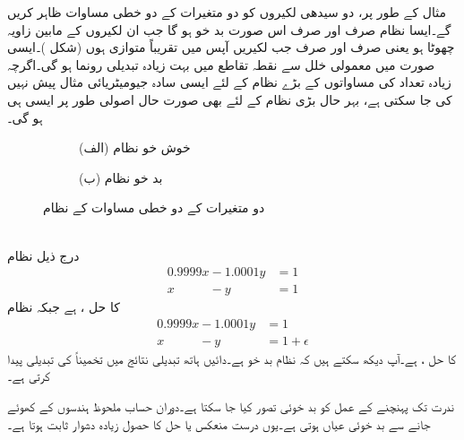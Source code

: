 مثال کے طور پر، دو سیدھی لکیروں کو دو متغیرات کے دو خطی مساوات ظاہر کریں گے۔ایسا نظام صرف اور صرف اس صورت بد خو ہو گا جب ان لکیروں کے مابین زاویہ  چھوٹا ہو یعنی صرف اور صرف جب لکیریں آپس میں تقریباً متوازی ہوں (شکل )۔ایسی صورت میں معمولی خلل سے نقطہ تقاطع میں بہت زیادہ تبدیلی رونما ہو گی۔اگرچہ زیادہ تعداد کی مساواتوں کے بڑے نظام کے لئے ایسی سادہ جیومیٹریائی مثال پیش نہیں کی جا سکتی ہے، بہر حال بڑی نظام کے لئے بھی  صورت حال اصولی طور پر ایسی ہی ہو گی۔ 
\begin{figure}
\centering
\begin{subfigure}{0.5\textwidth}
\centering
{}
\caption*{(الف) خوش خو نظام}
\end{subfigure}%
\begin{subfigure}{0.5\textwidth}
\centering
{}
\caption*{(ب) بد خو نظام}
\end{subfigure}%
\caption{دو متغیرات کے دو خطی مساوات کے نظام}
\label{شکل_خطی_اعدادی_بد_خو_خوش_خو}
\end{figure}

\quad {}\\
درج ذیل نظام
\begin{align*}
0.9999x-1.0001y&=1\\
x\phantom{1.0000}-y&=1
\end{align*}
کا حل ،  ہے جبکہ نظام
\begin{align*}
0.9999x-1.0001y&=1\\
x\phantom{1.0000}-y&=1+\epsilon
\end{align*}
کا حل ،  ہے۔آپ دیکھ سکتے ہیں کہ نظام بد خو ہے۔دائیں ہاتھ  تبدیلی نتائج میں تخمیناً   کی تبدیلی پیدا کرتی ہے۔

ندرت تک پہنچنے کے عمل کو بد خوئی تصور کیا جا سکتا ہے۔دوران حساب ملحوظ ہندسوں کے کھوئے جانے سے بد خوئی عیاں ہوتی ہے۔یوں درست منعکس یا حل کا حصول زیادہ دشوار ثابت ہوتا ہے۔

